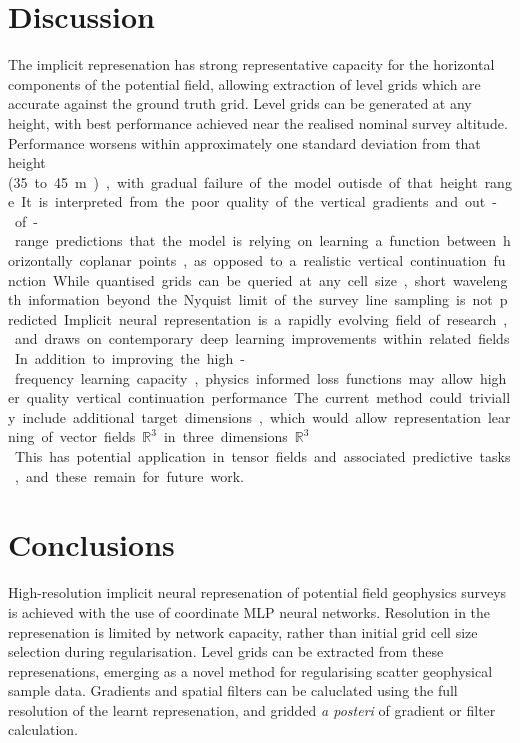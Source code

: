 \documentclass[manuscript.tex]{subfiles}
\begin{document}
\section{Discussion}
The implicit represenation has strong representative capacity for the horizontal components of the potential field, allowing extraction of level grids which are accurate against the ground truth grid.
Level grids can be generated at any height, with best performance achieved near the realised nominal survey altitude.
Performance worsens within approximately one standard deviation from that height (\SI{35} to \SI{45}{\m}), with gradual failure of the model outisde of that height range.
It is interpreted from the poor quality of the vertical gradients and out-of-range predictions that the model is relying on learning a function between horizontally coplanar points, as opposed to a realistic vertical continuation function.
While quantised grids can be queried at any cell size, short wavelength information beyond the Nyquist limit of the survey line sampling is not predicted.


Implicit neural representation is a rapidly evolving field of research, and draws on contemporary deep learning improvements within related fields.
In addition to improving the high-frequency learning capacity, physics informed loss functions may allow higher quality vertical continuation performance. 
The current method could trivially include additional target dimensions, which would allow representation learning of vector fields \(\mathbb{R}^{3}\) in three dimensions \(\mathbb{R}^{3}\).
This has potential application in tensor fields and associated predictive tasks, and these remain for future work.

\section{Conclusions}
High-resolution implicit neural represenation of potential field geophysics surveys is achieved with the use of coordinate MLP neural networks.
Resolution in the represenation is limited by network capacity, rather than initial grid cell size selection during regularisation.
Level grids can be extracted from these represenations, emerging as a novel method for regularising scatter geophysical sample data.
Gradients and spatial filters can be caluclated using the full resolution of the learnt represenation, and gridded \emph{a posteri} of gradient or filter calculation.
\end{document}
